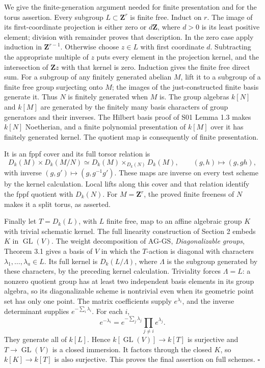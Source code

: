 \documentclass[11pt,a4paper,openany]{report}
\begin{document}
We give the finite-generation argument needed for finite presentation and for the torus assertion. Every subgroup \(L\subset\mathbf Z^r\) is finite free. Induct on \(r\). The image of its first-coordinate projection is either zero or \(d\mathbf Z\), where \(d>0\) is its least positive element; division with remainder proves that description. In the zero case apply induction in \(\mathbf Z^{r-1}\). Otherwise choose \(z\in L\) with first coordinate \(d\). Subtracting the appropriate multiple of \(z\) puts every element in the projection kernel, and the intersection of \(\mathbf Zz\) with that kernel is zero. Induction gives the finite free direct sum. For a subgroup of any finitely generated abelian \(M\), lift it to a subgroup of a finite free group surjecting onto \(M\); the images of the just-constructed finite basis generate it. Thus \(N\) is finitely generated when \(M\) is. The group algebras \(k[N]\) and \(k[M]\) are generated by the finitely many basis characters of group generators and their inverses. The Hilbert basis proof of S01 Lemma 1.3 makes \(k[N]\) Noetherian, and a finite polynomial presentation of \(k[M]\) over it has finitely generated kernel. The quotient map is consequently of finite presentation.

It is an fppf cover and its full torsor relation is \[
 D_k(M)\times D_k(M/N)\simeq
 D_k(M)\times_{D_k(N)}D_k(M),
 \qquad(g,h)\longmapsto(g,gh),
\] with inverse \((g,g')\mapsto(g,g^{-1}g')\). These maps are inverse on every test scheme by the kernel calculation. Local lifts along this cover and that relation identify the fppf quotient with \(D_k(N)\). For \(M=\mathbf Z^r\), the proved finite freeness of \(N\) makes it a split torus, as asserted.

Finally let \(T=D_k(L)\), with \(L\) finite free, map to an affine algebraic group \(K\) with trivial schematic kernel. The full linearity construction of Section 2 embeds \(K\) in \(\operatorname{GL}(V)\). The weight decomposition of AG-GS, \emph{Diagonalizable groups}, Theorem 3.1 gives a basis of \(V\) in which the \(T\)-action is diagonal with characters \(\lambda_1,\ldots,\lambda_a\in L\). Its full kernel is \(D_k(L/\Lambda)\), where \(\Lambda\) is the subgroup generated by these characters, by the preceding kernel calculation. Triviality forces \(\Lambda=L\): a nonzero quotient group has at least two independent basis elements in its group algebra, so its diagonalizable scheme is nontrivial even when its geometric point set has only one point. The matrix coefficients supply \(e^{\lambda_i}\), and the inverse determinant supplies \(e^{-\sum_i\lambda_i}\). For each \(i\), \[
 e^{-\lambda_i}=e^{-\sum_j\lambda_j}\prod_{j\ne i}e^{\lambda_j}.
\] They generate all of \(k[L]\). Hence \(k[\operatorname{GL}(V)]\to k[T]\) is surjective and \(T\to\operatorname{GL}(V)\) is a closed immersion. It factors through the closed \(K\), so \(k[K]\to k[T]\) is also surjective. This proves the final assertion on full schemes. \(\square\)
\end{document}
